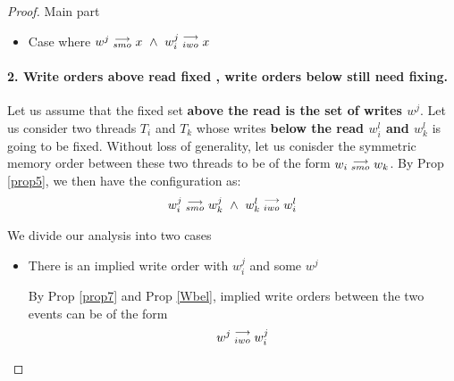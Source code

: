\begin{proof}{Main part}
\begin{itemize}
\begin{itemize}
                            \item Case where $w^j\stackrel{\longrightarrow}{_{smo}}x \ \wedge \ w_i^j\stackrel{\longrightarrow}{_{iwo}}x$
                        \end{itemize}
                
                \end{itemize}


            \paragraph{2. Write orders above read fixed , write orders below still need fixing.}
                Let us assume that the fixed set \textbf{above the read is the set of writes $w^j$}. Let us consider two threads $T_i$ and $T_k$ whose writes \textbf{below the read $w_i^l$ and $w_k^l$} is going to be fixed. Without loss of generality, let us conisder the symmetric memory order between these two threads to be of the form $w_i\stackrel{\longrightarrow}{_{smo}}w_k$.  By Prop \ref{prop5}, we then have the configuration as:
                \begin{align*}
                    \reln{w_i^j}{smo}{w_k^j} \ \wedge \ \reln{w_k^l}{iwo}{w_i^l}
                \end{align*}

                We divide our analysis into two cases 
                \begin{itemize}
                    \item There is an implied write order with $w_i^j$ and some $w^j$
                    
                        By Prop \ref{prop7} and Prop \ref{Wbel}, implied write orders between the two events can be of the form 
                        \begin{align*}
                            w^j\stackrel{\longrightarrow}{_{iwo}}w_i^j 
                        \end{align*}


\end{itemize}
\end{proof}
